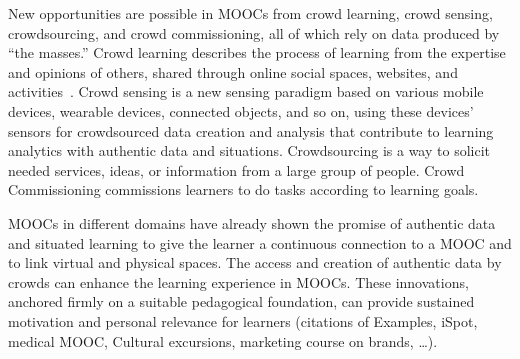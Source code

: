 New opportunities are
possible in MOOCs from crowd learning, crowd sensing, crowdsourcing,
and crowd commissioning, all of which rely on data produced by ``the
masses.'' 
Crowd learning
describes the process of learning from the expertise and opinions of
others, shared through online social spaces, websites, and
activities~\cite{innovating-pedagogy-2013}. 
Crowd sensing is a new sensing
paradigm based on various mobile devices, wearable devices, connected
objects, and so on,  using these devices' sensors for crowdsourced
data creation and analysis that contribute to learning analytics with
authentic data and situations. Crowdsourcing  is a way to solicit  needed
services, ideas, or information
from a large group of people. Crowd Commissioning 
commissions learners to do tasks according to learning goals.  

MOOCs in different domains have already shown the promise of
authentic data and situated learning to give the learner a continuous
connection to a MOOC and to link virtual and physical spaces.
The access and creation of authentic data by crowds can enhance the
learning experience in MOOCs. 
These innovations, anchored firmly on a suitable pedagogical foundation,
can provide sustained motivation and personal relevance for learners
(citations of Examples, iSpot, medical MOOC, Cultural excursions,
marketing course on brands, \ldots).

